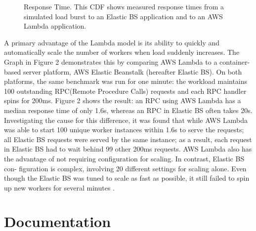 \documentclass[9pt,twocolumn,twoside]{../../styles/osajnl}
\begin{document}
\begin{figure}[H]
\centering
\graphicspath{ {images/} }
\caption{Response Time. This CDF shows measured
response times from a simulated load burst to an Elastic BS
application and to an AWS Lambda application.}  \cite{OpenLambda}
\label{fig:false-color}
\end{figure}

A primary advantage of the Lambda model is its ability
to quickly and automatically scale the number of workers
when load suddenly increases. The Graph in Figure 2 demonstrates this by 
comparing AWS Lambda to a container-based server platform,
AWS Elastic Beanstalk \cite{www-AWSEBS} (hereafter Elastic BS).
On both platforms, the same benchmark was run for one
minute: the workload maintains 100 outstanding RPC(Remote Procedure Calls)
requests and each RPC handler spins for 200ms.
Figure 2 shows the result: an RPC using AWS Lambda
has a median response time of only 1.6s, whereas an RPC
in Elastic BS often takes 20s. Investigating the cause for
this difference, it was found that while AWS Lambda was
able to start 100 unique worker instances within 1.6s to
serve the requests; all Elastic BS requests were served by
the same instance; as a result, each request in Elastic BS
had to wait behind 99 other 200ms requests.
AWS Lambda also has the advantage of not requiring
configuration for scaling. In contrast, Elastic BS con-
figuration is complex, involving 20 different settings for
scaling alone. Even though the Elastic BS was tuned to scale
as fast as possible, it still
failed to spin up new workers for several minutes  \cite{OpenLambda}.

\section{Documentation}
\end{document}
